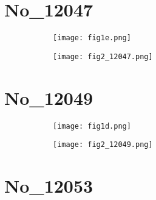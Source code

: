 \documentclass[%
 reprint,
 amsmath,amssymb,
 aps,
]{revtex4-2}
\begin{document}
\section{No_12047}

\begin{figure}[b]

\centering

\quad
    \begin{subfigure}[b]{0.45\textwidth}
    \centering
    \texttt{[image: fig1e.png]}
    \caption{\label{fig:fig1e.png}}
    \end{subfigure}
\quad
    \begin{subfigure}[b]{0.45\textwidth}
    \centering
    \texttt{[image: fig2\_12047.png]}
    \caption{\label{fig:fig2_12047.png}}
    \end{subfigure}


\captionsetup{justification=raggedright,singlelinecheck=false}
\caption{\label{fig:fig1e.png}}

\end{figure}



\section{No_12049}

\begin{figure}[b]

\centering

\quad
    \begin{subfigure}[b]{0.45\textwidth}
    \centering
    \texttt{[image: fig1d.png]}
    \caption{\label{fig:fig1d.png}}
    \end{subfigure}
\quad
    \begin{subfigure}[b]{0.45\textwidth}
    \centering
    \texttt{[image: fig2\_12049.png]}
    \caption{\label{fig:fig2_12049.png}}
    \end{subfigure}


\captionsetup{justification=raggedright,singlelinecheck=false}
\caption{\label{fig:fig1d.png}}

\end{figure}



\section{No_12053}
\end{document}
